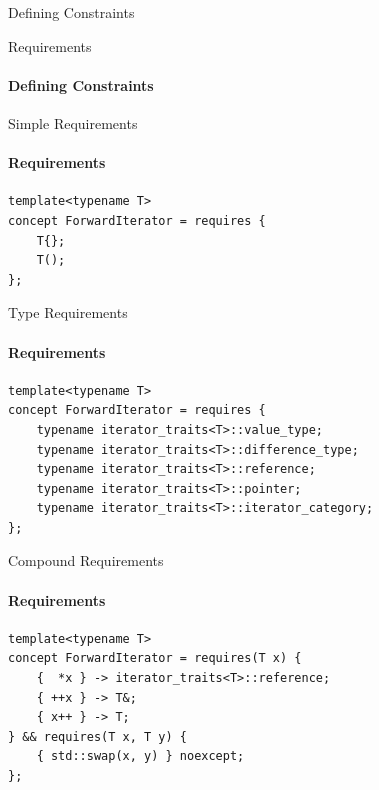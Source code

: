 \documentclass{beamer}
\begin{document}
    \begin{frame}[fragile]{Defining Constraints}
    \end{frame}

    \begin{frame}[fragile]{Requirements}
        \framesubtitle{Defining Constraints}
    \end{frame}

    \begin{frame}[fragile]{Simple Requirements}
        \framesubtitle{Requirements}
        \begin{center}
        \begin{lstlisting}[caption={simple requirements in an incomplete \texttt{ForwardIterator}.}]
template<typename T>
concept ForwardIterator = requires {
    T{};
    T();
};
\end{lstlisting}
        \end{center}
    \end{frame}

    \begin{frame}[fragile]{Type Requirements}
        \framesubtitle{Requirements}
        \begin{center}
        \begin{lstlisting}[caption={type requirements in our incomplete \texttt{ForwardIterator}.}]
template<typename T>
concept ForwardIterator = requires {
    typename iterator_traits<T>::value_type;
    typename iterator_traits<T>::difference_type;
    typename iterator_traits<T>::reference;
    typename iterator_traits<T>::pointer;
    typename iterator_traits<T>::iterator_category;
}; \end{lstlisting}
        \end{center}
    \end{frame}

    \begin{frame}[fragile]{Compound Requirements}
        \framesubtitle{Requirements}
        \begin{center}
        \begin{lstlisting}[caption={compound requirements found in an \texttt{ForwardIterator}.}]
template<typename T>
concept ForwardIterator = requires(T x) {
    {  *x } -> iterator_traits<T>::reference;
    { ++x } -> T&;
    { x++ } -> T;
} && requires(T x, T y) {
    { std::swap(x, y) } noexcept;
}; \end{lstlisting}
        \end{center}
    \end{frame}
\end{document}
